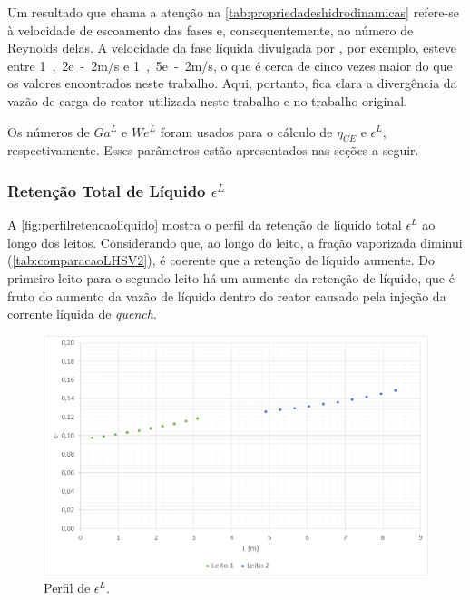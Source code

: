 Um resultado que chama a atenção na \autoref{tab:propriedadeshidrodinamicas}
refere-se à velocidade de escoamento das fases e, consequentemente, ao número de
Reynolds delas. A velocidade da fase líquida divulgada por
, por exemplo, esteve entre \si{1,2e-2}{m/s} e
\si{1,5e-2}{m/s}, o que é cerca de cinco vezes maior do que os valores
encontrados neste trabalho. Aqui, portanto, fica clara a divergência da vazão de
carga do reator utilizada neste trabalho e no trabalho original.

Os números de $Ga^L$ e $We^L$ foram usados para o cálculo de $\eta_{CE}$ e
$\epsilon^{L}$, respectivamente. Esses parâmetros estão apresentados nas seções
a seguir.

\subsubsection{Retenção Total de Líquido $\epsilon^{L}$}
\label{retencaototaldeliquido}

A \autoref{fig:perfilretencaoliquido} mostra o perfil da retenção de líquido
total $\epsilon^{L}$ ao longo dos leitos. Considerando que, ao longo do leito, a fração vaporizada diminui
(\autoref{tab:comparacaoLHSV2}), é coerente que a retenção de líquido aumente.
Do primeiro leito para o segundo leito há um aumento da retenção de líquido, que
é fruto do aumento da vazão de líquido dentro do reator causado pela injeção da
corrente líquida de \emph{quench}.

\begin{figure}[htb]
\centering
\includegraphics[scale=0.4]{images/Chap4/perfilretencaoliquido.png}
\caption{Perfil de $\epsilon^{L}$.}
\label{fig:perfilretencaoliquido}
\end{figure}

